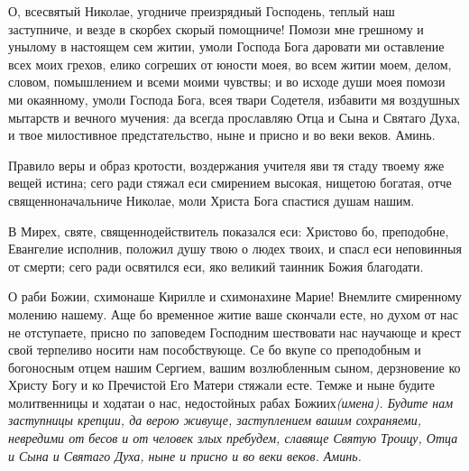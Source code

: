 

\label{_content_svyatim-oputeshestvuyuchih}

 

 

О, всесвятый Николае, угодниче преизрядный Господень, теплый наш заступниче, и везде в скорбех скорый помощниче! Помози мне грешному и унылому в настоящем сем житии, умоли Господа Бога даровати ми оставление всех моих грехов, елико согреших от юности моея, во всем житии моем, делом, словом, помышлением и всеми моими чувствы; и во исходе души моея помози ми окаянному, умоли Господа Бога, всея твари Содетеля, избавити мя воздушных мытарств и вечного мучения: да всегда прославляю Отца и Сына и Святаго Духа, и твое милостивное предстательство, ныне и присно и во веки веков. Аминь.




Правило веры и образ кротости, воздержания учителя яви тя стаду твоему яже вещей истина; сего ради стяжал еси смирением высокая, нищетою богатая, отче священноначальниче Николае, моли Христа Бога спастися душам нашим.




В Мирех, святе, священнодействитель показался еси: Христово бо, преподобне, Евангелие исполнив, положил душу твою о людех твоих, и спасл еси неповинныя от смерти; сего ради освятился еси, яко великий таинник Божия благодати. 
\mychapterending

 


О раби Божии, схимонаше Кирилле и схимонахине Марие! Внемлите смиренному молению нашему. Аще бо временное житие ваше скончали есте, но духом от нас не отступаете, присно по заповедем Господним шествовати нас научающе и крест свой терпеливо носити нам пособствующе. Се бо вкупе со преподобным и богоносным отцем нашим Сергием, вашим возлюбленным сыном, дерзновение ко Христу Богу и ко Пречистой Его Матери стяжали есте. Темже и ныне будите молитвенницы и ходатаи о нас, недостойных рабах Божиих\itshape  (имена)\normalfont{}. Будите нам заступницы крепции, да верою живуще, заступлением вашим сохраняеми, невредими от бесов и от человек злых пребудем, славяще Святую Троицу, Отца и Сына и Святаго Духа, ныне и присно и во веки веков. Аминь. 
\mychapterending

